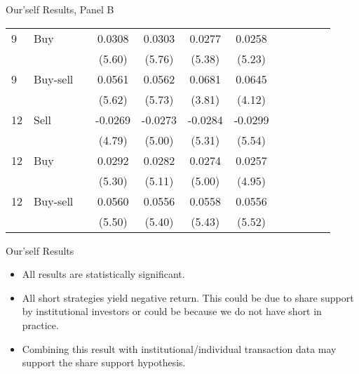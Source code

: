 \documentclass{beamer}
\begin{document}
\begin{frame}{Our'self Results, Panel B}
\begin{table}
\begin{tabular}{llrSSSScSSSS}
			9  & Buy      &    & 0.0308                & 0.0303                & 0.0277                & 0.0258                 \\
			   &          &    & (5.60)                & (5.76)                & (5.38)                & (5.23)                 \\
			9  & Buy-sell &    & 0.0561                & 0.0562                & 0.0681                & 0.0645                 \\
			   &          &    & (5.62)                & (5.73)                & (3.81)                & (4.12)                 \\
			12 & Sell     &    & -0.0269               & -0.0273               & -0.0284               & -0.0299                \\
			   &          &    & (4.79)                & (5.00)                & (5.31)                & (5.54)                 \\
			12 & Buy      &    & 0.0292                & 0.0282                & 0.0274                & 0.0257                 \\
			   &          &    & (5.30)                & (5.11)                & (5.00)                & (4.95)                 \\
			12 & Buy-sell &    & 0.0560                & 0.0556                & 0.0558                & 0.0556                 \\
			   &          &    & (5.50)                & (5.40)                & (5.43)                & (5.52)                 \\
			\bottomrule
		\end{tabular}
	\end{table}
\end{frame}

\begin{frame}{Our'self Results}
	\begin{itemize}
		\item All results are statistically significant.
		\item All short strategies yield negative return. This could be due to share support by institutional investors or could be because we do not have short in practice.
		\item \Im Combining this result with institutional/individual transaction data may support the share support hypothesis.
	\end{itemize}
\end{frame}
\end{document}
